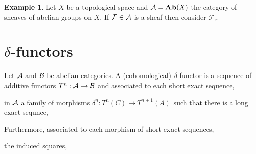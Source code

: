 \documentclass[12pt]{extarticle}
\theoremstyle{definition}
\newtheorem{example}[theorem]{Example}
\newenvironment{definition}[1][Definition:]{\begin{trivlist}
\item[\hskip \labelsep {\bfseries #1}]}{\end{trivlist}}
\newcommand{\F}{\mathcal{F}}
\begin{document}
\begin{example}
Let $X$ be a topological space and $\mathcal{A} = \mathbf{Ab}(X)$ the category of sheaves of abelian groups on $X$. If $\F \in \A$ is a sheaf then consider $\F_x$
\end{example}

\section{$\delta$-functors}

\begin{definition}
Let $\mathcal{A}$ and $\mathcal{B}$ be abelian categories. A (cohomological) $\delta$-functor is a sequence of additive functors $T^n : \mathcal{A} \to \mathcal{B}$ and associated to each short exact sequence,
\begin{center}
\end{center}
in $\mathcal{A}$ a family of morphisms $\delta^n : T^n(C) \to T^{n+1}(A)$ such that there is a long exact sequnce,
\begin{center}
\end{center}
Furthermore, associated to each morphism of short exact sequences,
\begin{center}
\end{center}
the induced squares,
\begin{center}
\end{center}
\end{definition}
\end{document}
